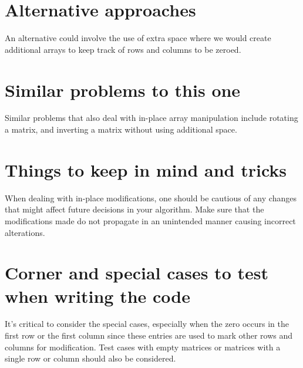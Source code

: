 \section*{Alternative approaches}

An alternative could involve the use of extra space where we would create additional arrays to keep track of rows and columns to be zeroed. 

\section*{Similar problems to this one}

Similar problems that also deal with in-place array manipulation include rotating a matrix, and inverting a matrix without using additional space.

\section*{Things to keep in mind and tricks}

When dealing with in-place modifications, one should be cautious of any changes that might affect future decisions in your algorithm. Make sure that the modifications made do not propagate in an unintended manner causing incorrect alterations.

\section*{Corner and special cases to test when writing the code}

It's critical to consider the special cases, especially when the zero occurs in the first row or the first column since these entries are used to mark other rows and columns for modification. Test cases with empty matrices or matrices with a single row or column should also be considered.